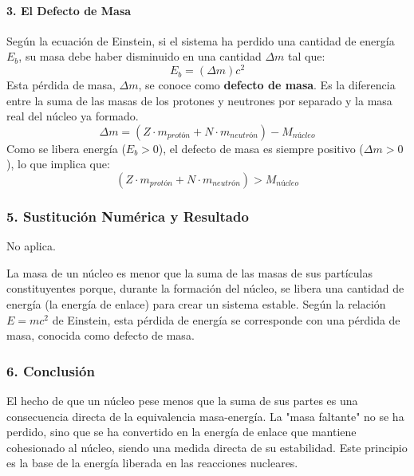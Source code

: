 \paragraph{3. El Defecto de Masa}
Según la ecuación de Einstein, si el sistema ha perdido una cantidad de energía $E_b$, su masa debe haber disminuido en una cantidad $\Delta m$ tal que:
$$ E_b = (\Delta m) c^2 $$
Esta pérdida de masa, $\Delta m$, se conoce como \textbf{defecto de masa}. Es la diferencia entre la suma de las masas de los protones y neutrones por separado y la masa real del núcleo ya formado.
$$ \Delta m = (Z \cdot m_{protón} + N \cdot m_{neutrón}) - M_{núcleo} $$
Como se libera energía ($E_b > 0$), el defecto de masa es siempre positivo ($\Delta m > 0$), lo que implica que:
$$ (Z \cdot m_{protón} + N \cdot m_{neutrón}) > M_{núcleo} $$

\subsubsection*{5. Sustitución Numérica y Resultado}
No aplica.
\begin{cajaresultado}
La masa de un núcleo es menor que la suma de las masas de sus partículas constituyentes porque, durante la formación del núcleo, se libera una cantidad de energía (la energía de enlace) para crear un sistema estable. Según la relación $E=mc^2$ de Einstein, esta pérdida de energía se corresponde con una pérdida de masa, conocida como defecto de masa.
\end{cajaresultado}

\subsubsection*{6. Conclusión}
\begin{cajaconclusion}
El hecho de que un núcleo pese menos que la suma de sus partes es una consecuencia directa de la equivalencia masa-energía. La "masa faltante" no se ha perdido, sino que se ha convertido en la energía de enlace que mantiene cohesionado al núcleo, siendo una medida directa de su estabilidad. Este principio es la base de la energía liberada en las reacciones nucleares.
\end{cajaconclusion}

\newpage